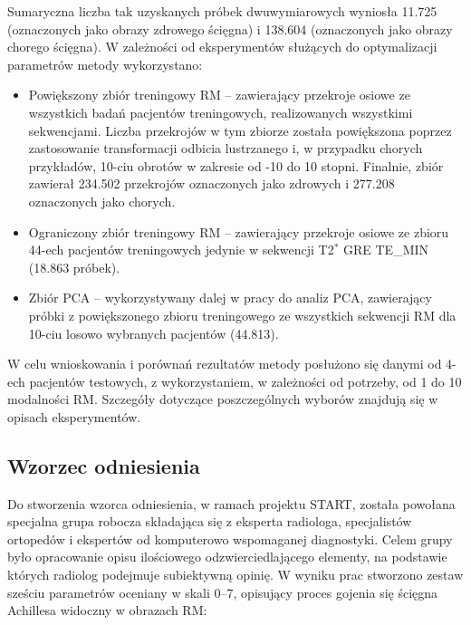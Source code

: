 Sumaryczna liczba tak uzyskanych próbek dwuwymiarowych wyniosła 11.725 (oznaczonych jako obrazy zdrowego ścięgna) i 138.604 (oznaczonych jako obrazy chorego ścięgna). W zależności od eksperymentów służących do optymalizacji parametrów metody wykorzystano:
\begin{itemize}[noitemsep,nolistsep]
	\item Powiększony zbiór treningowy RM -- zawierający przekroje osiowe ze wszystkich badań pacjentów treningowych, realizowanych wszystkimi sekwencjami. Liczba przekrojów w tym zbiorze została powiększona poprzez zastosowanie transformacji odbicia lustrzanego i, w przypadku chorych przykładów, 10-ciu obrotów w zakresie od -10 do 10 stopni. Finalnie, zbiór zawierał 234.502 przekrojów oznaczonych jako zdrowych i 277.208 oznaczonych jako chorych.
	\item Ograniczony zbiór treningowy RM -- zawierający przekroje osiowe ze zbioru 44-ech pacjentów treningowych jedynie w sekwencji T2$^\ast$ GRE TE\_MIN (18.863 próbek).
	\item Zbiór PCA -- wykorzystywany dalej w pracy do analiz PCA, zawierający próbki z powiększonego zbioru treningowego \linebreak ze wszystkich sekwencji RM dla 10-ciu losowo wybranych pacjentów (44.813).
\end{itemize}

W celu wnioskowania i porównań rezultatów metody posłużono się danymi \linebreak od 4-ech pacjentów testowych, z wykorzystaniem, w zależności od potrzeby, od 1 do 10 modalności RM. Szczegóły dotyczące poszczególnych wyborów znajdują się \linebreak w opisach eksperymentów.


\subsection{Wzorzec odniesienia}
\label{seq:ground-truth}
Do stworzenia wzorca odniesienia, w ramach projektu START, została powołana specjalna grupa robocza składająca się z eksperta radiologa, specjalistów ortopedów i ekspertów od komputerowo wspomaganej diagnostyki. Celem grupy było opracowanie opisu ilościowego odzwierciedlającego elementy, na podstawie których radiolog podejmuje subiektywną opinię. W wyniku prac stworzono zestaw sześciu parametrów oceniany w skali 0--7, opisujący proces gojenia się ścięgna Achillesa widoczny w obrazach RM:

